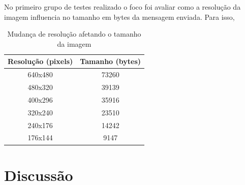 \documentclass[
article,			%
12pt,				%
oneside,			%
a4paper,			%
english,			%
brazil,				%
sumario=tradicional
]{abntex2}
\begin{document}
No primeiro grupo de testes realizado o foco foi avaliar como a resolução da imagem influencia no tamanho em bytes da mensagem enviada. Para isso, 

\begin{table}[]
\centering
\begin{tabular}{@{}c|c@{}}
\toprule
Resolução (pixels) & Tamanho (bytes) \\ \midrule
640x480            & 73260           \\
480x320            & 39139           \\
400x296            & 35916           \\
320x240            & 23510           \\
240x176            & 14242           \\
176x144            & 9147            \\ \bottomrule
\end{tabular}
\caption{Mudança de resolução afetando o tamanho da imagem}
\label{tab:resolution}
\end{table}

\cleardoublepage

\section{Discussão}


\postextual

\cleardoublepage

\end{document}
